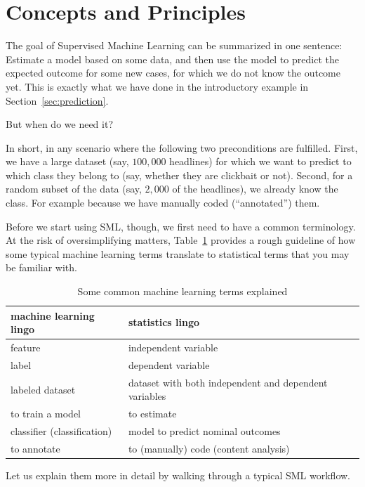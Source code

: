 \section{Concepts and Principles}
\label{sec:principles}

The goal of Supervised Machine Learning can be summarized in one sentence:
Estimate a model based on some data, and then use the model to predict the
expected outcome for some new cases, for which we do not know the outcome yet.
This is exactly what we have done in the introductory example in Section~\ref{sec:prediction}.

But when do we need it?

In short, in any scenario where the following two preconditions are fulfilled.
First, we have a large dataset (say, $100,000$
headlines) for which we want to predict to which class they belong to (say, whether
they are clickbait or not).
Second, for a random subset of the data (say, $2,000$ of the headlines), we already
know the class.
For example because we have manually coded (``annotated'') them.

Before we start using SML, though, we first need to have
a common terminology.
At the risk of oversimplifying matters, Table~\ref{tab:mllingo} provides a rough
guideline of how some typical machine learning terms translate to statistical
terms that you may be familiar with.

\begin{table}
\caption{Some common machine learning terms explained\label{tab:mllingo}}{
  \centering
\begin{tabularx}{\textwidth}{XX}
\toprule
machine learning lingo  & statistics lingo\\ \midrule
feature                 & independent variable  \\
label                   & dependent variable  \\
labeled dataset         & dataset with both independent and dependent variables\\
to train a model        & to estimate \\
classifier (classification)  & model to predict nominal outcomes \\
to annotate             & to (manually) code (content analysis) \\
\bottomrule
\end{tabularx}}{}
\end{table}

Let us explain them more in detail by walking through a typical SML workflow.

